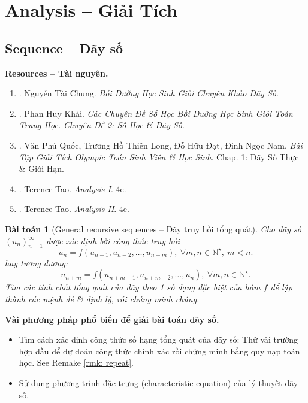 \documentclass{article}
\newtheorem{baitoan}{Bài toán}
\begin{document}

\section{Analysis -- Giải Tích}
\label{sect: analysis}

\subsection{Sequence -- Dãy số}
\textbf{\textsf{Resources -- Tài nguyên.}}
\begin{enumerate}
	\item \cite{Chung_day_so}. {\sc Nguyễn Tài Chung}. {\it Bồi Dưỡng Học Sinh Giỏi Chuyên Khảo Dãy Số}.
	\item \cite{Khai_so_hoc_day_so}. {\sc Phan Huy Khải}. {\it Các Chuyên Đề Số Học Bồi Dưỡng Học Sinh Giỏi Toán Trung Học. Chuyên Đề 2: Số Học \& Dãy Số}.
	\item \cite{Quoc_Long_Dat_Nam_VMC}. {\sc Văn Phú Quốc, Trương Hồ Thiên Long, Đỗ Hữu Đạt, Đinh Ngọc Nam}. {\it Bài Tập Giải Tích Olympic Toán Sinh Viên \& Học Sinh}. Chap. 1: Dãy Số Thực \& Giới Hạn.
	\item \cite{Tao_analysis_1}. {\sc Terence Tao}. {\it Analysis I}. 4e.
	\item \cite{Tao_analysis_2}. {\sc Terence Tao}. {\it Analysis II}. 4e.
\end{enumerate}

\begin{baitoan}[General recursive sequences -- Dãy truy hồi tổng quát]
	Cho dãy số $(u_n)_{n=1}^\infty$ được xác định bởi công thức truy hồi
	\begin{equation}
		\boxed{u_n = f(u_{n-1},u_{n-2},\ldots,u_{n-m}),\ \forall m,n\in\mathbb{N}^\star,\ m < n.}
	\end{equation}
	hay tương đương:
	\begin{equation*}
		\boxed{u_{n + m} = f(u_{n + m - 1},u_{n+m-2},\ldots,u_n),\ \forall m,n\in\mathbb{N}^\star.}
	\end{equation*}
	Tìm các tính chất tổng quát của dãy theo 1 số dạng đặc biệt của hàm $f$ để lập thành các mệnh đề \& định lý, rồi chứng minh chúng.
\end{baitoan}
\textbf{\textsf{Vài phương pháp phổ biến để giải bài toán dãy số.}}
\begin{itemize}
	\item Tìm cách xác định công thức số hạng tổng quát của dãy số: Thử vài trường hợp đầu để dự đoán công thức chính xác rồi chứng minh bằng quy nạp toán học. See Remake \ref{rmk: repeat}.
	\item Sử dụng phương trình đặc trưng (characteristic equation) của lý thuyết dãy số.
\end{itemize}
\end{document}
